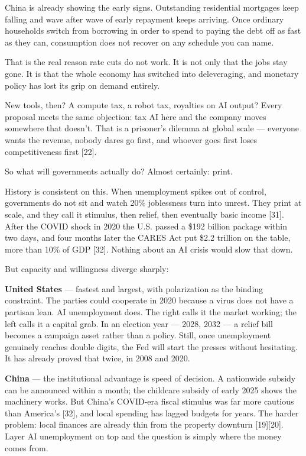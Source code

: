 \documentclass[11pt,a4paper]{article}
\begin{document}
China is already showing the early signs. Outstanding residential mortgages keep falling and wave after wave of early repayment keeps arriving. Once ordinary households switch from borrowing in order to spend to paying the debt off as fast as they can, consumption does not recover on any schedule you can name.

That is the real reason rate cuts do not work. It is not only that the jobs stay gone. It is that the whole economy has switched into deleveraging, and monetary policy has lost its grip on demand entirely.

New tools, then? A compute tax, a robot tax, royalties on AI output? Every proposal meets the same objection: tax AI here and the company moves somewhere that doesn't. That is a prisoner's dilemma at global scale --- everyone wants the revenue, nobody dares go first, and whoever goes first loses competitiveness first [22].

So what will governments actually do? Almost certainly: print.

History is consistent on this. When unemployment spikes out of control, governments do not sit and watch 20\% joblessness turn into unrest. They print at scale, and they call it stimulus, then relief, then eventually basic income [31]. After the COVID shock in 2020 the U.S. passed a \$192 billion package within two days, and four months later the CARES Act put \$2.2 trillion on the table, more than 10\% of GDP [32]. Nothing about an AI crisis would slow that down.

But capacity and willingness diverge sharply:

\textbf{United States} --- fastest and largest, with polarization as the binding constraint. The parties could cooperate in 2020 because a virus does not have a partisan lean. AI unemployment does. The right calls it the market working; the left calls it a capital grab. In an election year --- 2028, 2032 --- a relief bill becomes a campaign asset rather than a policy. Still, once unemployment genuinely reaches double digits, the Fed will start the presses without hesitating. It has already proved that twice, in 2008 and 2020.

\textbf{China} --- the institutional advantage is speed of decision. A nationwide subsidy can be announced within a month; the childcare subsidy of early 2025 shows the machinery works. But China's COVID-era fiscal stimulus was far more cautious than America's [32], and local spending has lagged budgets for years. The harder problem: local finances are already thin from the property downturn [19][20]. Layer AI unemployment on top and the question is simply where the money comes from.
\end{document}

